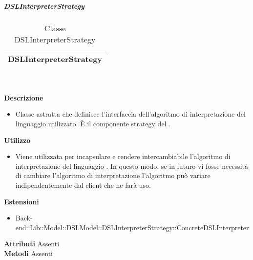 			\subparagraph{DSLInterpreterStrategy} 
\begin{table}[ht]
\begin{center}
\bgroup
	\setlength{\arrayrulewidth}{0.6mm}
	\def\arraystretch{1}
		\begin{tabular}{ | p{12cm} | }
				\hline  
					\centerline{\textbf{DSLInterpreterStrategy}}
		\\ \hline 
				\hline
				\hline
		
		\end{tabular}
\egroup
\caption{Classe DSLInterpreterStrategy}
\end{center}
\end{table} \textbf{\\ \\ Descrizione}
\begin{itemize}
\item[] Classe astratta che definisce l'interfaccia dell'algoritmo di interpretazione del linguaggio  utilizzato. È il componente strategy del  .
\end{itemize} 
\textbf{Utilizzo}
\begin{itemize}
\item[] Viene utilizzata per incapsulare e rendere intercambiabile l'algoritmo di interpretazione del linguaggio . In questo modo, se in futuro vi fosse necessità di cambiare l'algoritmo di interpretazione l'algoritmo può variare indipendentemente dal client che ne farà uso.
\end{itemize}
\textbf{Estensioni}
\begin{itemize}
\item{Back-end::Lib::Model::DSLModel::DSLInterpreterStrategy::ConcreteDSLInterpreter}
\end{itemize}
\textbf{Attributi}
Assenti \\
\textbf{Metodi}
Assenti \\

